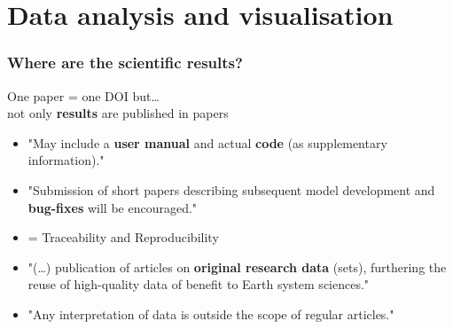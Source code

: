 \section{Data analysis and visualisation}
\begin{frame}[c]

 


\end{frame}








\begin{frame}[c]
\frametitle{Where are the scientific results?}

One paper = one DOI but\ldots \\
not only \textbf{results} are published in papers

\vspace{1cm}


\begin{itemize}
\footnotesize
\item<3-> "May include a \textbf{user manual} and actual \textbf{code} (as supplementary information)."

\item<4-> "Submission of short papers describing subsequent model development and \textbf{bug-fixes} will be encouraged."

\item<5->[]= Traceability and Reproducibility

\end{itemize}



\begin{itemize}
\footnotesize
\item<7-> "(\ldots) publication of articles on \textbf{original research data} (sets), furthering the reuse of high-quality data of benefit to Earth system sciences."

\item<8-> "Any interpretation of data is outside the scope of regular articles."


\end{itemize}

\end{frame}


